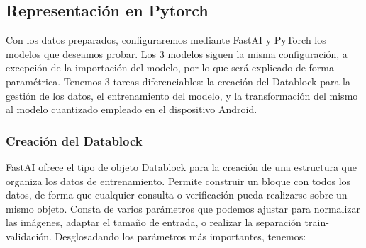 \subsection{Representación en Pytorch}

Con los datos preparados, configuraremos mediante FastAI y PyTorch los modelos que deseamos probar. Los 3 modelos siguen la misma configuración, a excepción de la importación del modelo, por lo  que será explicado de forma paramétrica. Tenemos 3 tareas diferenciables: la creación del Datablock para la gestión de los datos, el entrenamiento del modelo, y la transformación del mismo al modelo cuantizado empleado en el dispositivo Android.

\subsubsection{Creación del Datablock}

FastAI ofrece el tipo de objeto Datablock para la creación de una estructura que organiza los datos de entrenamiento. Permite construir un bloque con todos los datos, de forma que cualquier consulta o verificación pueda realizarse sobre un mismo objeto. Consta de varios parámetros que podemos ajustar para normalizar las imágenes, adaptar el tamaño de entrada, o realizar la separación train-validación. Desglosadando los parámetros más importantes, tenemos:


